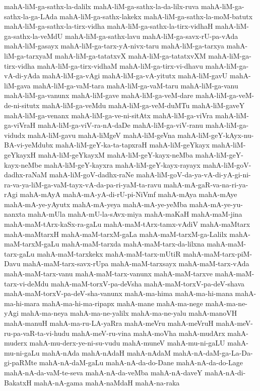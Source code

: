 {mahA-liM-ga-sathx-la-dalilx
mahA-liM-ga-sathx-la-da-lilx-ruva
mahA-liM-ga-sathx-la-ga-LAda
mahA-liM-ga-sathx-lakekx
mahA-liM-ga-sathx-la-moM-batutx
mahA-liM-ga-sathx-la-tirx-vidha
mahA-liM-ga-sathx-la-tirx-vidhaH
mahA-liM-ga-sathx-la-veMdU
mahA-liM-ga-sathx-lavu
mahA-liM-ga-savx-rU-pa-vAda
mahA-liM-gasayx
mahA-liM-ga-tarx-yA-nivx-taru
mahA-liM-ga-tarxya
mahA-liM-ga-tarxyaM
mahA-liM-ga-tatatxvX
mahA-liM-ga-tatatxvXM
mahA-liM-ga-tirx-vidha
mahA-liM-ga-tirx-vidhaM
mahA-liM-ga-tirx-vi-dhavu
mahA-liM-ga-vA-di-yAda
mahA-liM-ga-vAgi
mahA-liM-ga-vA-yitutx
mahA-liM-gavU
mahA-liM-gava
mahA-liM-ga-vaM-tara
mahA-liM-ga-vaM-taru
mahA-liM-ga-vanu
mahA-liM-ga-vanunx
mahA-liM-gave
mahA-liM-ga-veM-dare
mahA-liM-ga-veM-de-ni-situtx
mahA-liM-ga-veMdu
mahA-liM-ga-veM-duMTu
mahA-liM-gaveY
mahA-liM-ga-venanx
mahA-liM-ga-ve-ni-sitAtx
mahA-liM-ga-viVra
mahA-liM-ga-viVraH
mahA-liM-ga-viV-ra-nA-daDe
mahA-liM-ga-viV-ranu
mahA-liM-ga-vidudx
mahA-liM-gavu
mahA-liMgeV
mahA-liM-geVna
mahA-liM-geY-kAyx-nu-BA-vi-yeMdubx
mahA-liM-geY-ka-ta-tapxraH
mahA-liM-geYkayx
mahA-liM-geYkayxH
mahA-liM-geYkayxM
mahA-liM-geY-kayx-neMba
mahA-liM-geY-kayx-neMbe
mahA-liM-geY-kayxra
mahA-liM-geY-kayx-rayayx
mahA-liM-goV-dadhx-raNaM
mahA-liM-goV-dadhx-raNe
mahA-liM-goV-da-ya-vA-di-yA-gi-ni-ra-va-ya-liM-ga-vaM-tayx-vA-da-pa-ri-yaM-ta-ravu
mahA-mA-gaR-va-na-ri-ya-rAgi
mahA-mAyA
mahA-mA-yA-di-rU-pi-NiVmf
mahA-mAya
mahA-mAye
mahA-mA-ye-yAyutx
mahA-mA-yeya
mahA-mA-ye-yeMba
mahA-mA-ye-yu-nanxta
mahA-mUla
mahA-mU-la-sAvx-miya
mahA-maKaH
mahA-maM-jina
mahA-maM-tArx-kaSx-ra-gaLu
mahA-maM-tArx-tamx-vAdiV
mahA-maMtarx
mahA-maMtarxH
mahA-maM-tarxM-gaLa
mahA-maM-tarxM-ga-Lalilx
mahA-maM-tarxM-gaLu
mahA-maM-tarxda
mahA-maM-tarx-da-lilxna
mahA-maM-tarx-gaLu
mahA-maM-tarxkekx
mahA-maM-tarx-mUtiR
mahA-maM-tarx-piM-Davu
mahA-maM-tarx-savx-rUpa
mahA-maM-tarxsayx
mahA-maM-tarx-vAda
mahA-maM-tarx-vanu
mahA-maM-tarx-vanunx
mahA-maM-tarxve
mahA-maM-tarx-vi-deMdu
mahA-maM-torxV-pa-deVsha
mahA-maM-torxV-pa-deV-shava
mahA-maM-torxV-pa-deV-sha-vanunx
mahA-ma-hima
mahA-ma-hi-mana
mahA-ma-hi-mara
mahA-ma-hi-ma-ripapx
mahA-mane
mahA-ma-nege
mahA-ma-ne-yAgi
mahA-ma-neya
mahA-ma-ne-yalilx
mahA-ma-ne-yalu
mahA-manoVH
mahA-manuH
mahA-ma-ru-LA-yaRra
mahA-meVru
mahA-meVruH
mahA-meV-ru-pa-vaR-ta-vi-hudu
mahA-meV-ru-vina
mahA-moVha
mahA-mudArx
mahA-muderx
mahA-mu-derx-ye-ni-su-vudu
mahA-muneV
mahA-mu-ni-gaLU
mahA-mu-ni-gaLu
mahA-nAda
mahA-nAdaH
mahA-nAdaM
mahA-nA-daM-ga-La-Da-gi-paRMte
mahA-nA-daM-gaLu
mahA-nA-da-do-Dane
mahA-nA-da-do-Lage
mahA-nA-da-vaM-te-seva
mahA-nA-da-veMba
mahA-nA-daveY
mahA-nA-di-BakatxH
mahA-nA-gama
mahA-naMdaH
mahA-na-raka
}
